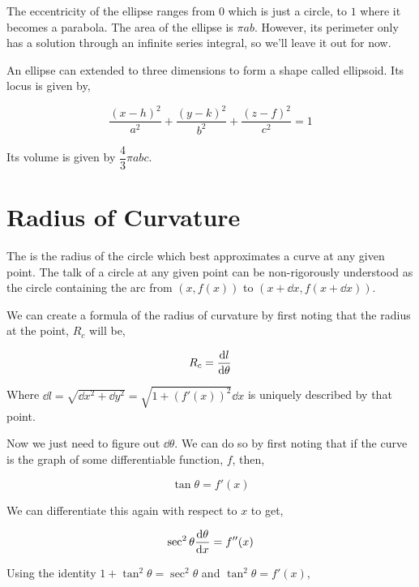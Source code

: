 The eccentricity of the ellipse ranges from \(0\) which is just a circle, to \(1\) where 
it becomes a parabola. The area of the ellipse is \(\pi ab\). However, its 
perimeter only has a solution through an infinite series integral, so we'll leave it 
out for now.

An ellipse can extended to three dimensions to form a shape called ellipsoid. Its locus is given by,

\begin{equation}
    \frac{(x-h)^2}{a^2} + \frac{(y-k)^2}{b^2} + \frac{(z-f)^2}{c^2} = 1
\end{equation}

Its volume is given by \(\dfrac{4}{3}\pi abc\).

\section{Radius of Curvature}

The  is the radius of the circle which best approximates 
a curve at any given point. The talk of a circle at any given point can be non-rigorously 
understood as the circle containing the arc from \((x, f(x))\) to \((x + \dd{x}, f(x + \dd{x}))\). 

We can create a formula of the radius of curvature by first noting that the 
radius at the point, \(R_c\) will be, 

\begin{equation*}
    R_c = \dv{l}{\theta}
\end{equation*}

Where \(\dd{l} = \sqrt{\dd{x}^2 + \dd{y}^2} = \sqrt{1 + (f'(x))^2} \dd{x}\) is uniquely described by that point. 

Now we just need to figure out \(\dd{\theta}\). We can do so by first noting that 
if the curve is the graph of some differentiable function, \(f\), then,

\begin{equation*}
    \tan \theta = f'(x)
\end{equation*}

We can differentiate this again with respect to \(x\) to get,

\begin{equation*}
    \sec^2\theta \dv{\theta}{x} = f''(x)
\end{equation*}

Using the identity \(1 + \tan^2\theta = \sec^2 \theta\) and \(\tan^2 \theta = f'(x)\),


